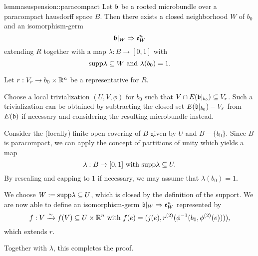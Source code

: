 \begin{mystatement}{lemma}{suspension::paracompact}
    Let $\bb$ be a rooted microbundle over a paracompact hausdorff space $B$.
    Then there exists a closed neighborhood $W$ of $b_0$ and an isomorphism-germ
    \[ \germ{\bb[W]}{\be{W}} \]
    extending $R$ together with a map $\lambda: B \to [0, 1]$ with
    \[ \text{supp}{\lambda} \subseteq{} W \text{ and } \lambda(b_0) = 1. \]
\end{mystatement}

\begin{myproof}
    Let $r: V_r \to b_0 \times \mathbb{R}^n$ be a representative for $R$.
    
    Choose a local trivialization $(U, V, \phi)$ for $b_0$ such that $V \cap E(\bbb) \sub V_r$.
    Such a trivialization can be obtained by subtracting the closed set
    $E(\bbb) - V_r$ from $E(\bb)$ if necessary
    and considering the resulting microbundle instead.
    
    Consider the (locally) finite open covering of $B$ given by $U$ and $B - \{b_0\}$.
    Since $B$ is paracompact, we can apply the concept
    of partitions of unity which yields a map
    \[ \lambda: B \to [0, 1] \text{ with } \text{supp}{\lambda} \subseteq{} U. \]
    By rescaling and capping to $1$ if necessary,
    we may assume that $\lambda(b_0) = 1$.

    We choose $W := \text{supp}{\lambda} \subseteq{} U$,
    which is closed by the definition of the support.
    We are now able to define an isomorphism-germ $\germ{\bb[W]}{\be{W}}$ represented by
    \[ f: V \xrightarrow{\sim} f(V) \subseteq{} U \times \mathbb{R}^n \text{ with } f(e) = (j(e), r^{(2)}(\phi^{-1}(b_0, \phi^{(2)}(e)))), \]
    which extends $r$.

    Together with $\lambda$, this completes the proof.
\end{myproof}